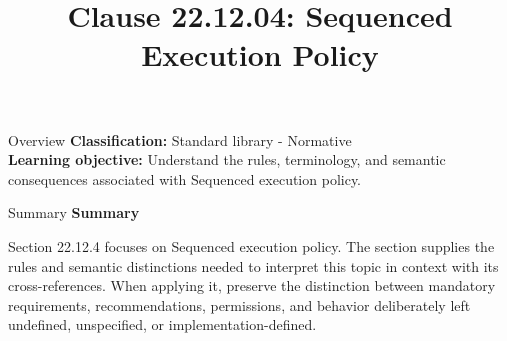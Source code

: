 \documentclass[10pt,letterpaper]{article}
\title{Clause 22.12.04: Sequenced Execution Policy}
\author{}
\date{}
\begin{document}
\maketitle
\begin{CornellOverviewBox}{Overview}
\textbf{Classification:} Standard library - Normative\\[2pt]
\textbf{Learning objective:} Understand the rules, terminology, and semantic consequences associated with Sequenced execution policy.
\end{CornellOverviewBox}\begin{CornellSummaryBox}{Summary}
{\sffamily\bfseries\color{Accent} Summary}\par\vspace{3pt}Section 22.12.4 focuses on Sequenced execution policy. The section supplies the rules and semantic distinctions needed to interpret this topic in context with its cross-references. When applying it, preserve the distinction between mandatory requirements, recommendations, permissions, and behavior deliberately left undefined, unspecified, or implementation-defined.
\end{CornellSummaryBox}
\end{document}
